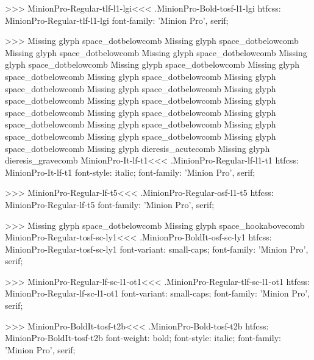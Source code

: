 {>>>
\<MinionPro-Regular-tlf-l1-lgi\><<<
.MinionPro-Bold-tosf-l1-lgi
htfcss:  MinionPro-Regular-tlf-l1-lgi  font-family: 'Minion Pro', serif;

>>>
Missing glyph	space_dotbelowcomb
Missing glyph	space_dotbelowcomb
Missing glyph	space_dotbelowcomb
Missing glyph	space_dotbelowcomb
Missing glyph	space_dotbelowcomb
Missing glyph	space_dotbelowcomb
Missing glyph	space_dotbelowcomb
Missing glyph	space_dotbelowcomb
Missing glyph	space_dotbelowcomb
Missing glyph	space_dotbelowcomb
Missing glyph	space_dotbelowcomb
Missing glyph	space_dotbelowcomb
Missing glyph	space_dotbelowcomb
Missing glyph	space_dotbelowcomb
Missing glyph	space_dotbelowcomb
Missing glyph	space_dotbelowcomb
Missing glyph	space_dotbelowcomb
Missing glyph	space_dotbelowcomb
Missing glyph	space_dotbelowcomb
Missing glyph	dieresis_acutecomb
Missing glyph	dieresis_gravecomb
\<MinionPro-It-lf-t1\><<<
.MinionPro-Regular-lf-l1-t1
htfcss:  MinionPro-It-lf-t1  font-style: italic; font-family: 'Minion Pro', serif;

>>>
\<MinionPro-Regular-lf-t5\><<<
.MinionPro-Regular-osf-l1-t5
htfcss:  MinionPro-Regular-lf-t5  font-family: 'Minion Pro', serif;

>>>
Missing glyph	space_dotbelowcomb
Missing glyph	space_hookabovecomb
\<MinionPro-Regular-tosf-sc-ly1\><<<
.MinionPro-BoldIt-osf-sc-ly1
htfcss:  MinionPro-Regular-tosf-sc-ly1  font-variant: small-caps; font-family: 'Minion Pro', serif;

>>>
\<MinionPro-Regular-lf-sc-l1-ot1\><<<
.MinionPro-Regular-tlf-sc-l1-ot1
htfcss:  MinionPro-Regular-lf-sc-l1-ot1  font-variant: small-caps; font-family: 'Minion Pro', serif;

>>>
\<MinionPro-BoldIt-tosf-t2b\><<<
.MinionPro-Bold-tosf-t2b
htfcss:  MinionPro-BoldIt-tosf-t2b  font-weight: bold; font-style: italic; font-family: 'Minion Pro', serif;

}
